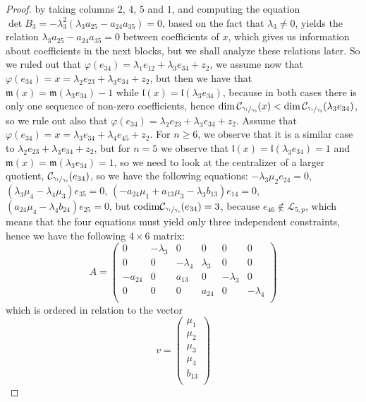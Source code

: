 \documentclass[12pt]{article}
\newcommand*\circled[1]{\tikz[baseline=(char.base)]{
            \small \node[shape=circle,draw,inner sep=1pt] (char) {#1};}}
\begin{document}
\begin{proof}
by taking columns $2$, $4$, $5$ and $1$, and computing the equation $\det B_3=-\lambda_3^2(\lambda_3 a_{25}-a_{24}a_{35})=0$, based on the fact that $\lambda_3\neq 0$, yields the relation $\lambda_3 a_{25}-a_{24}a_{35}=0$ between coefficients of $x$, which gives us information about coefficients in the next blocks, but we shall analyze these relations later. So we ruled out that $\varphi(e_{34})=\lambda_1 e_{12}+\lambda_3 e_{34}+z_2$, we assume now that $\varphi(e_{34})=x=\lambda_2 e_{23}+\lambda_3 e_{34}+z_2$, but then we have that $\mathfrak{m}(x)=\mathfrak{m}(\lambda_3 e_{34})-1$ while $\mathfrak{l}(x)=\mathfrak{l}(\lambda_3 e_{34})$, because in both cases there is only one sequence of non-zero coefficients, hence $\dim\mathcal{C}_{\sfrac{\gamma_1}{\gamma_3}}(x)<\dim\mathcal{C}_{\sfrac{\gamma_1}{\gamma_3}}(\lambda_3 e_{34})$, so we rule out also that $\varphi(e_{34})=\lambda_2 e_{23}+\lambda_3 e_{34}+z_2$. Assume that $\varphi(e_{34})=x=\lambda_3 e_{34}+\lambda_4 e_{45}+z_2$. For $n\geq 6$, we observe that it is a similar case to $\lambda_2 e_{23}+\lambda_3 e_{34}+z_2$, but for $n=5$ we observe that $\mathfrak{l}(x)=\mathfrak{l}(\lambda_3 e_{34})=1$ and $\mathfrak{m}(x)=\mathfrak{m}(\lambda_3 e_{34})=1$, so we need to look at the centralizer of a larger quotient, $\mathcal{C}_{\sfrac{\gamma_1}{\gamma_4}}(e_{34})$, so we have the following equations: \circled{1} $-\lambda_3\mu_2 e_{24}=0$, \circled{2} $(\lambda_3\mu_4-\lambda_4\mu_3)e_{35}=0$, $(-a_{24}\mu_1+a_{13}\mu_3-\lambda_3 b_{13})e_{14}=0$, \circled{4} $(a_{24}\mu_4-\lambda_4 b_{24})e_{25}=0$, but $\mathrm{codim}\mathcal{C}_{\sfrac{\gamma_1}{\gamma_4}}(e_{34})=3$, because $e_{46}\notin\mathcal{L}_{5,p}$, which means that the four equations must yield only three independent constraints, hence we have the following $4\times 6$ matrix: \[A=\begin{pmatrix}
0 & -\lambda_3 & 0 & 0 & 0 & 0\\
0 & 0 & -\lambda_4 & \lambda_3 & 0 & 0\\
-a_{24} & 0 & a_{13} & 0 & -\lambda_3 & 0\\
0 & 0 & 0 & a_{24} & 0 & -\lambda_4\\
\end{pmatrix}\]
which is ordered in relation to the vector \[
v=\begin{pmatrix}
\mu_1\\
\mu_2\\
\mu_3\\
\mu_4\\
b_{13}\\

\end{pmatrix}\]
\end{proof}
\end{document}
